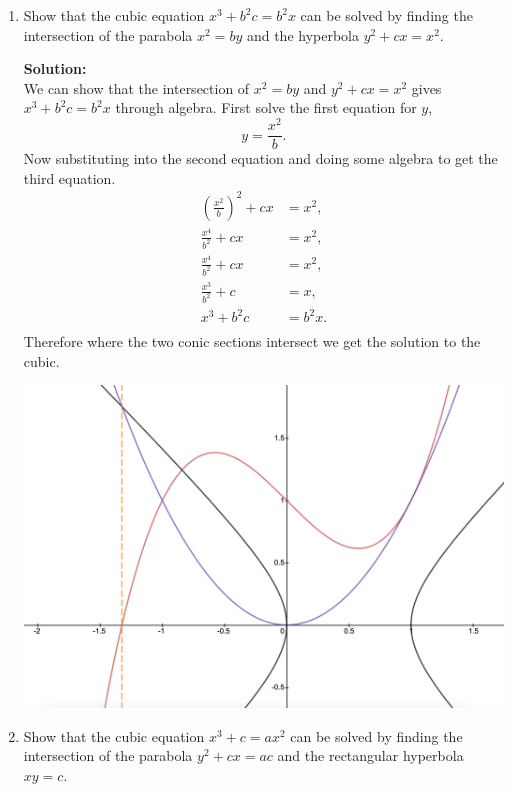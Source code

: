 \documentclass[12pt]{article}
\makeatletter
\theoremstyle{homework}
\newenvironment{exercise}[1]
{\def\@currentlabel{#1}\exercisecore}
{\endexercisecore}
\newcommand{\localhead}[1]{\par\smallskip\noindent\textbf{#1}\nobreak\\}%
\newcommand\solution{\localhead{Solution:}}
\makeatother
\begin{document}
\begin{exercise}{7}
  \begin{enumerate}
    \item Show that the cubic equation $x^3 + b^2c = b^2x$ can be solved by finding the intersection of the 
    parabola $x^2 = by$ and the hyperbola $y^2 + cx = x^2$.\\

    \solution We can show that the intersection of $x^2 = by$ and $y^2 + cx = x^2$ gives $x^3 + b^2c = b^2x$ through algebra.
    First solve the first equation for $y$, 
    \begin{equation*}
      y = \frac{x^2}{b}. 
    \end{equation*}
    Now substituting into the second equation and doing some algebra to get the third equation. 
    \begin{align*}
      (\frac{x^2}{b})^2 + cx &= x^2,\\
      \frac{x^4}{b^2} + cx &= x^2,\\
      \frac{x^4}{b^2} + cx &= x^2,\\
      \frac{x^3}{b^2} + c &= x,\\
      x^3 + b^2c &= b^2x.\\
    \end{align*}
    Therefore where the two conic sections intersect we get the solution to the cubic. 
  \begin{center}
    \includegraphics[width = .90\textwidth]{curve1.png}
  \end{center}  




    \vspace{.25in}


    \item Show that the cubic equation $x^3 + c = ax^2$ can be solved by finding the intersection of the parabola $y^2 + cx = ac$
    and the rectangular hyperbola $xy = c$. \\


\end{enumerate}
\end{exercise}
\end{document}
